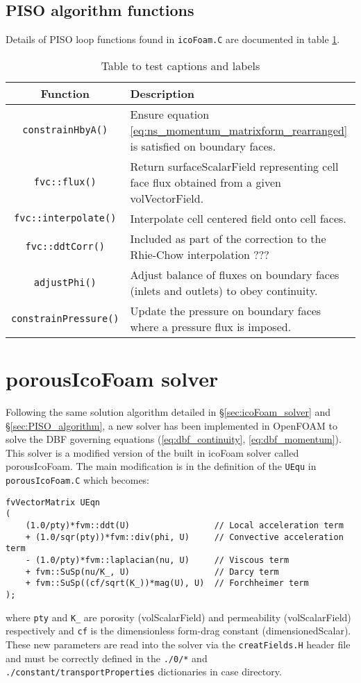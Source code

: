 \documentclass[a4paper,11pt]{report}
\begin{document}
\subsection{PISO algorithm functions}
Details of PISO loop functions found in \texttt{icoFoam.C} are documented in table \ref{table:piso_loop_functions}.
\begin{table}[ht]
\begin{center}
\begin{tabularx}{\textwidth}{ c | p{105mm} }
    Function & Description \\
    \hline\hline
    \texttt{constrainHbyA()} & Ensure equation \ref{eq:ns_momentum_matrixform_rearranged} is satisfied on boundary faces.\\
    \hline
    \texttt{fvc::flux()} & Return surfaceScalarField representing cell face flux obtained from a given volVectorField. \\
    \hline
    \texttt{fvc::interpolate()} & Interpolate cell centered field onto cell faces. \\
    \hline
    \texttt{fvc::ddtCorr()} & Included as part of the correction to the Rhie-Chow interpolation \cite{Rhie1983}???\\
    \hline
    \texttt{adjustPhi()} & Adjust balance of fluxes on boundary faces (inlets and outlets) to obey continuity. \\
    \hline
    \texttt{constrainPressure()} & Update the pressure on boundary faces where a pressure flux is imposed. \\
\end{tabularx}
\end{center}
\caption{Table to test captions and labels}
\label{table:piso_loop_functions}
\end{table}

\section{porousIcoFoam solver}
Following the same solution algorithm detailed in §\ref{sec:icoFoam_solver} and §\ref{sec:PISO_algorithm}, a new solver has been implemented in OpenFOAM to solve the DBF governing equations (\ref{eq:dbf_continuity}, \ref{eq:dbf_momentum}). This solver is a modified version of the built in icoFoam solver called porousIcoFoam. The main modification is in the definition of the \texttt{UEqu} in \texttt{porousIcoFoam.C} which becomes:
\begin{verbatim}
fvVectorMatrix UEqn
(
    (1.0/pty)*fvm::ddt(U)                 // Local acceleration term
    + (1.0/sqr(pty))*fvm::div(phi, U)     // Convective acceleration term
    - (1.0/pty)*fvm::laplacian(nu, U)     // Viscous term
    + fvm::SuSp(nu/K_, U)                 // Darcy term
    + fvm::SuSp((cf/sqrt(K_))*mag(U), U)  // Forchheimer term
);
\end{verbatim}
where \texttt{pty} and \texttt{K\_} are porosity (volScalarField) and permeability (volScalarField) respectively and \texttt{cf} is the dimensionless form-drag constant (dimensionedScalar). These new parameters are read into the solver via the \texttt{creatFields.H} header file and must be correctly defined in the \texttt{./0/*} and \texttt{./constant/transportProperties} dictionaries in case directory.
\end{document}
